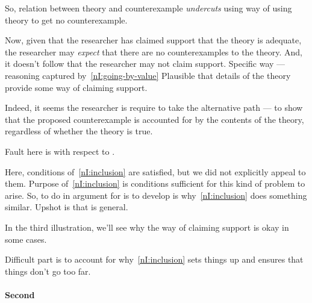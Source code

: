 \begin{note}
  So, relation between theory and counterexample \emph{undercuts} using way of using theory to get no counterexample.

  Now, given that the researcher has claimed support that the theory is adequate, the researcher may \emph{expect} that there are no counterexamples to the theory.
  And, it doesn't follow that the researcher may not claim support.
  Specific way --- reasoning captured by~\ref{nI:going-by-value}
  Plausible that details of the theory provide some way of claiming support.

  Indeed, it seems the researcher is require to take the alternative path --- to show that the proposed counterexample is accounted for by the contents of the theory, regardless of whether the theory is true.

  Fault here is with respect to \eiS{}.
  {
    \color{red}
    Here, conditions of~\ref{nI:inclusion} are satisfied, but we did not explicitly appeal to them.
    Purpose of~\ref{nI:inclusion} is conditions sufficient for this kind of problem to arise.
    So, to do in argument for \nI{} is to develop is why~\ref{nI:inclusion} does something similar.
    Upshot is that \nI{} is general.

    In the third illustration, we'll see why the way of claiming support is okay in some cases.
  }
  Difficult part is to account for why~\ref{nI:inclusion} sets things up and ensures that things don't go too far.
\end{note}

\paragraph{Second}

